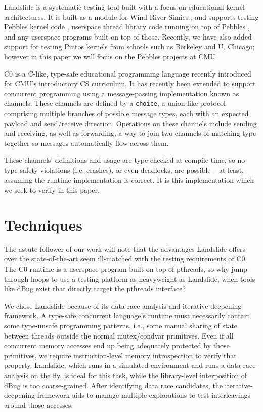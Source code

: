 \documentclass{article}
\begin{document}
Landslide \cite{landslide} is a systematic testing tool built with a focus on educational kernel architectures.
It is built as a module for Wind River Simics \cite{simics}, and supports testing Pebbles kernel code \cite{kspec}, userspace thread library code running on top of Pebbles \cite{thrlib}, and any userspace programs built on top of those.
Recently, we have also added support for testing Pintos kernels \cite{pintos} from schools such as Berkeley and U. Chicago; however in this paper we will focus on the Pebbles projects at CMU.

C0 \cite{c0} is a C-like, type-safe educational programming language recently introduced for CMU's introductory CS curriculum.
It has recently been extended to support concurrent programming using a message-passing implementation known as channels.
These channels are defined by a {\tt choice}, a union-like protocol comprising multiple branches of possible message types, each with an expected payload and send/receive direction. Operations on these channels include sending and receiving, as well as forwarding, a way to join two channels of matching type together so messages automatically flow across them.

These channels' definitions and usage are type-checked at compile-time, so no type-safety violations (i.e. crashes), or even deadlocks, are possible -- at least, assuming the runtime implementation is correct. It is this implementation which we seek to verify in this paper.

\section{Techniques}

The astute follower of our work will note that the advantages Landslide offers over the state-of-the-art seem ill-matched with the testing requirements of C0. The C0 runtime is a userspace program built on top of pthreads, so why jump through hoops to use a testing platform as heavyweight as Landslide, when tools like dBug exist that directly target the pthreads interface?

We chose Landslide because of its data-race analysis and iterative-deepening framework.
A type-safe concurrent language's runtime must necessarily contain some type-unsafe programming patterns, i.e., some manual sharing of state between threads outside the normal mutex/condvar primitives.
Even if all concurrent memory accesses end up being adequately protected by those primitives, we require instruction-level memory introspection to verify that property.
Landslide, which runs in a simulated environment and runs a data-race analysis on the fly, is ideal for this task, while the library-level interposition of dBug is too coarse-grained.
After identifying data race candidates, the iterative-deepening framework aids to manage multiple explorations to test interleavings around those accesses.
\end{document}
